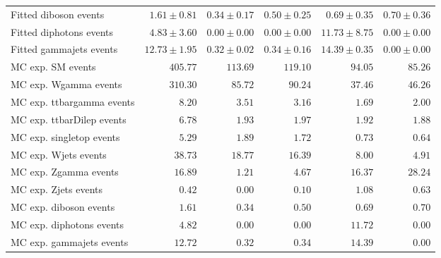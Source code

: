 \begin{table}
\begin{center}
{\begin{tabular*}{\textwidth}{@{\extracolsep{\fill}}lrrrrr}
        Fitted diboson events         & $1.61 \pm 0.81$          & $0.34 \pm 0.17$          & $0.50 \pm 0.25$          & $0.69 \pm 0.35$          & $0.70 \pm 0.36$              \\
        Fitted diphotons events         & $4.83 \pm 3.60$          & $0.00 \pm 0.00$          & $0.00 \pm 0.00$          & $11.73 \pm 8.75$          & $0.00 \pm 0.00$              \\
        Fitted gammajets events         & $12.73 \pm 1.95$          & $0.32 \pm 0.02$          & $0.34 \pm 0.16$          & $14.39 \pm 0.35$          & $0.00 \pm 0.00$              \\
 \noalign{\smallskip}\hline\noalign{\smallskip}
MC exp. SM events              & $405.77$          & $113.69$          & $119.10$          & $94.05$          & $85.26$              \\
\noalign{\smallskip}\hline\noalign{\smallskip}
        MC exp. Wgamma events         & $310.30$          & $85.72$          & $90.24$          & $37.46$          & $46.26$              \\
        MC exp. ttbargamma events         & $8.20$          & $3.51$          & $3.16$          & $1.69$          & $2.00$              \\
        MC exp. ttbarDilep events         & $6.78$          & $1.93$          & $1.97$          & $1.92$          & $1.88$              \\
        MC exp. singletop events         & $5.29$          & $1.89$          & $1.72$          & $0.73$          & $0.64$              \\
        MC exp. Wjets events         & $38.73$          & $18.77$          & $16.39$          & $8.00$          & $4.91$              \\
        MC exp. Zgamma events         & $16.89$          & $1.21$          & $4.67$          & $16.37$          & $28.24$              \\
        MC exp. Zjets events         & $0.42$          & $0.00$          & $0.10$          & $1.08$          & $0.63$              \\
        MC exp. diboson events         & $1.61$          & $0.34$          & $0.50$          & $0.69$          & $0.70$              \\
        MC exp. diphotons events         & $4.82$          & $0.00$          & $0.00$          & $11.72$          & $0.00$              \\
        MC exp. gammajets events         & $12.72$          & $0.32$          & $0.34$          & $14.39$          & $0.00$              \\

\end{tabular*}}
\end{center}
\end{table}
